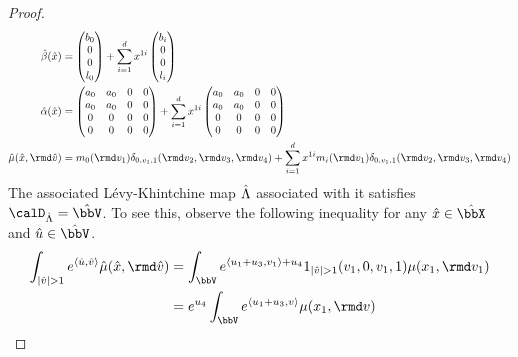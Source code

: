 \begin{proof}
  \begin{align*}
    \hat\affDrift(\hat\stateVar) &= \begin{pmatrix} \affDriftPart_0 \\ 0 \\ 0 \\ \affIntPart_0 \end{pmatrix} + \sum_{i=1}^d \stateVar^{1i} \begin{pmatrix} \affDriftPart_i \\ 0 \\ 0 \\ \affIntPart_i \end{pmatrix} \\
    \hat\affDiff(\hat\stateVar) &=  \begin{pmatrix} \affDiffPart_0 & \affDiffPart_0 & 0 & 0 \\ \affDiffPart_0 & \affDiffPart_0 & 0 & 0 \\ 0 & 0 & 0 & 0 \\ 0 & 0 & 0 & 0 \end{pmatrix} + \sum_{i=1}^d \stateVar^{1i} \begin{pmatrix} \affDiffPart_0 & \affDiffPart_0 & 0 & 0 \\ \affDiffPart_0 & \affDiffPart_0 & 0 & 0 \\ 0 & 0 & 0 & 0 \\ 0 & 0 & 0 & 0 \end{pmatrix} \\
      \hat\affJump(\hat\stateVar, \rmd\hat\markVar) &= \affJumpPart_0(\rmd\markVar_1)\delta_{0,\markVar_1,1}(\rmd\markVar_2,\rmd\markVar_3,\rmd\markVar_4)+ \sum_{i=1}^d \stateVar^{1i}  \affJumpPart_i(\rmd\markVar_1)\delta_{0,\markVar_1,1}(\rmd\markVar_2, \rmd\markVar_3, \rmd\markVar_4)
  \end{align*}
  The associated L\'evy-Khintchine map $\hat{\Lambda}$ associated with it satisfies $\odeSpaceJoint = \hat\vecSpace$.
  To see this, observe the following inequality for any $\hat\stateVar \in \hat\stateSpace$ and $\hat\momentVar \in \hat\vecSpace$.
  \begin{align*}
    \int_{|\hat\markVar|>1} e^\prj{\hat\momentVar}{\hat\markVar} \hat\affJump(\hat\stateVar, \rmd\hat\markVar)
    &= \int_\vecSpace e^{\prj{\momentVar_1+\momentVar_3}{\markVar_1} + \momentVar_4} 1_{|\hat\markVar|>1}(\markVar_1, 0, \markVar_1, 1) \affJump(\stateVar_1,\rmd\markVar_1) \\
    &= e^{\momentVar_4} \int_\vecSpace e^{\prj{\momentVar_1+\momentVar_3}{\markVar}} \affJump(\stateVar_1, \rmd\markVar)

\end{align*}
\end{proof}
